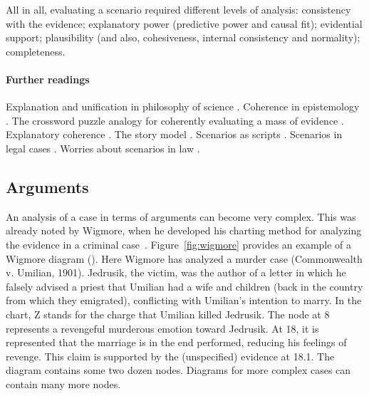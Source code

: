 \documentclass[10pt]{article}
\begin{document}
All in all, evaluating a scenario required different levels of analysis: consistency with the evidence; 
explanatory power (predictive power and causal fit); evidential support; plausibility 
(and also, cohesiveness, internal consistency and normality); completeness.




\paragraph{Further readings}

Explanation and unification 
in philosophy of science \citep{friedman1974}. 
Coherence in epistemology \citep{bonjour1985}.
The crossword puzzle analogy for coherently 
evaluating a mass of evidence \citep{haack2008}.
Explanatory coherence \citep{thagard2001}.
The story model \citep{penningtonHastie1993StoryModel}. 
Scenarios as scripts \citep{wagenaarEtal1993}.
Scenarios in legal cases \citep{griffin2013}. 
Worries about scenarios in law \citep{velleman2003}.






\subsection{Arguments}
\label{sec:coh-arg}

An analysis of a case in terms of arguments can become very complex. This was already noted by Wigmore, when he developed his charting method for analyzing the evidence in a criminal case~\citep{wigmore1913,wigmore1931}. Figure~\ref{fig:wigmore} provides an example of a Wigmore diagram (\citeyear{wigmore1931}). Here Wigmore has analyzed a murder case (Commonwealth v. Umilian, 1901). Jedrusik, the victim, was the author of a letter in which he falsely advised a priest that Umilian had a wife and children (back in the country from which they emigrated), conflicting with Umilian’s intention to marry. In the chart, Z stands for the charge that Umilian killed Jedrusik. The node at 8 represents a revengeful murderous emotion toward Jedrusik. At 18, it is represented that the marriage is in the end performed, reducing his feelings of revenge. This claim is supported by the (unspecified) evidence at 18.1. The diagram contains some two dozen nodes. Diagrams for more complex cases can contain many more nodes.
\end{document}
